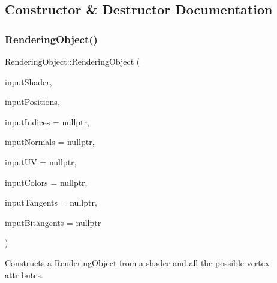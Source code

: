 \subsection{Constructor \& Destructor Documentation}
\hypertarget{class_rendering_object_ab5e3376ea0eb6290cdc55750a420b9d1}{}\label{class_rendering_object_ab5e3376ea0eb6290cdc55750a420b9d1} 
\subsubsection{\texorpdfstring{Rendering\+Object()}{RenderingObject()}}
{\footnotesize\ttfamily Rendering\+Object\+::\+Rendering\+Object (\begin{DoxyParamCaption}\item[{std\+::shared\+\_\+ptr$<$ class \hyperlink{class_shader_program}{Shader\+Program} $>$}]{input\+Shader,  }\item[{std\+::unique\+\_\+ptr$<$ \hyperlink{class_rendering_object_a1223b9cf03f2029b9c43d71042c2a18e}{Position\+Array} $>$}]{input\+Positions,  }\item[{std\+::unique\+\_\+ptr$<$ \hyperlink{class_rendering_object_a9931c88bca3384065c6691dfe1e60af1}{Index\+Array} $>$}]{input\+Indices = {\ttfamily nullptr},  }\item[{std\+::unique\+\_\+ptr$<$ \hyperlink{class_rendering_object_a327c4d892de8d6138fb59afa6d078257}{Normal\+Array} $>$}]{input\+Normals = {\ttfamily nullptr},  }\item[{std\+::unique\+\_\+ptr$<$ \hyperlink{class_rendering_object_a504ecd45ebe36dfa5b78c46d64d9904a}{U\+V\+Array} $>$}]{input\+UV = {\ttfamily nullptr},  }\item[{std\+::unique\+\_\+ptr$<$ \hyperlink{class_rendering_object_a8a12e1f9be788d99af6c089e1c600022}{Color\+Array} $>$}]{input\+Colors = {\ttfamily nullptr},  }\item[{std\+::unique\+\_\+ptr$<$ \hyperlink{class_rendering_object_a45b53e911c2f0131aa10e89869d38944}{Tangent\+Array} $>$}]{input\+Tangents = {\ttfamily nullptr},  }\item[{std\+::unique\+\_\+ptr$<$ \hyperlink{class_rendering_object_a6c6bf305a5f0f9ce1006f374c753c856}{Bitangent\+Array} $>$}]{input\+Bitangents = {\ttfamily nullptr} }\end{DoxyParamCaption})}



Constructs a \hyperlink{class_rendering_object}{Rendering\+Object} from a shader and all the possible vertex attributes. 


